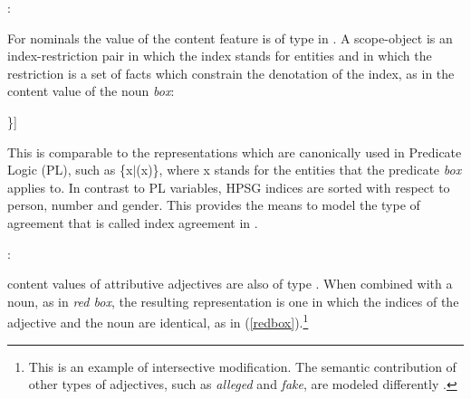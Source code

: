 \documentclass[output=paper]{langsci/langscibook}
\begin{document}
\begin{exe} 
\ex  {}: \begin{avm} 
                   \end{avm} 
\end{exe} 

\noindent 
For nominals the value of the {\sc content} feature is of type  
in \citet{GS00}. 
A scope-object is an index-restriction pair in which the index stands for 
entities and in which the restriction is a set of facts which constrain the 
denotation of the index, as in the {\sc content} value of the noun \emph{box}:    

\begin{exe} 
\ex\label{red} 
\begin{avm}
[\type{scope-obj}        \\
 index ~ @1 \type{index} \\
 restr ~ \{[\type{box}   \\
            arg ~ @1 ]\}]
\end{avm} 
\end{exe}

\noindent
This is comparable to the representations which are canonically used in 
Predicate Logic (PL), such as \{x$|$(x)\}, where x stands for 
the entities that the predicate \emph{box} applies to. In contrast to 
PL variables, HPSG indices are sorted with respect to person, number 
and gender. This provides the means to model the type of agreement that 
is called index agreement in .

\begin{exe} 
\ex  {}: \begin{avm}
                     \end{avm} 
\end{exe} 

{\sc content} values of attributive adjectives are also of type . 
When combined with a noun, as in \emph{red box}, the resulting representation 
is one in which the indices of the adjective and the noun are identical, as in 
(\ref{redbox}).\footnote{This is an example of intersective modification. 
The semantic contribution of other types of adjectives, such as  
\emph{alleged} and \emph{fake}, are modeled differently \citep[330--331]{ps2}.}   
\end{document}
